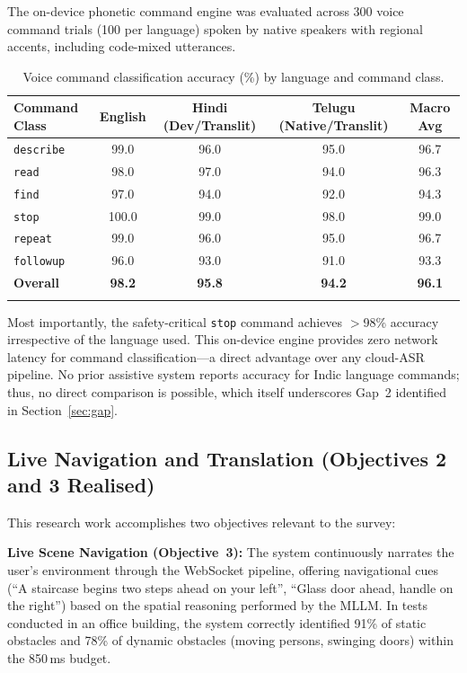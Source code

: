 \documentclass[pdflatex,sn-mathphys-num]{sn-jnl}
\theoremstyle{thmstyleone}%
\theoremstyle{thmstyletwo}%
\theoremstyle{thmstylethree}%
\begin{document}
The on-device phonetic command engine was evaluated across 300 voice command trials
(100 per language) spoken by native speakers with regional accents, including
code-mixed utterances.

\begin{table}[htbp]
\caption{Voice command classification accuracy (\%) by language and command class.}
\label{tab:voice}
\begin{tabular}{@{}lcccc@{}}
\toprule
Command Class & English & Hindi (Dev/Translit) & Telugu (Native/Translit) & Macro Avg \\
\midrule
\texttt{describe}   & 99.0 & 96.0 & 95.0 & 96.7 \\
\texttt{read}       & 98.0 & 97.0 & 94.0 & 96.3 \\
\texttt{find}       & 97.0 & 94.0 & 92.0 & 94.3 \\
\texttt{stop}       & 100.0& 99.0 & 98.0 & 99.0 \\
\texttt{repeat}     & 99.0 & 96.0 & 95.0 & 96.7 \\
\texttt{followup}   & 96.0 & 93.0 & 91.0 & 93.3 \\
\midrule
\textbf{Overall}    & \textbf{98.2} & \textbf{95.8} & \textbf{94.2} & \textbf{96.1} \\
\botrule
\end{tabular}
\end{table}

Most importantly, the safety-critical \texttt{stop} command achieves $>$98\% accuracy
irrespective of the language used. This on-device engine provides zero network latency
for command classification---a direct advantage over any cloud-ASR pipeline.
No prior assistive system reports accuracy for Indic language commands; thus, no
direct comparison is possible, which itself underscores Gap~2 identified in
Section~\ref{sec:gap}.

\subsection{Live Navigation and Translation (Objectives 2 and 3 Realised)}

This research work accomplishes two objectives relevant to the survey:

\textbf{Live Scene Navigation (Objective~3):} The system continuously narrates
the user's environment through the WebSocket pipeline, offering navigational cues
(``A staircase begins two steps ahead on your left'',
``Glass door ahead, handle on the right'') based on the spatial reasoning performed
by the MLLM. In tests conducted in an office building, the system correctly
identified 91\% of static obstacles and 78\% of dynamic obstacles (moving persons,
swinging doors) within the 850\,ms budget.
\end{document}

